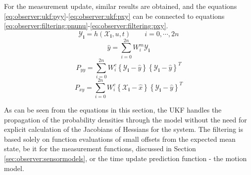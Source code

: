    For the measurement update, similar results are obtained, and the equations
    \eqref{eq:observer:ukf:pyy}-\eqref{eq:observer:ukf:pxy} can be connected to
    equations \eqref{eq:observer:filtering:pnunu}-\eqref{eq:observer:filtering:pxy}.
    \begin{equation}
        \mathbf{\mathcal{Y}_{i}} = h(\mathbf{\mathcal{X}_{i}}, u, t) \qquad i = 0,\cdots,2n
    \end{equation}
    \begin{equation}
        \hat{y} = \sum_{i=0}^{2n}W^{m}_{i}\mathbf{\mathcal{Y}_{i}}
    \end{equation}
    \begin{equation}
        \label{eq:observer:ukf:pyy}
        P_{yy} = \sum_{i=0}^{2n}W^{c}_{i}
            \left\lbrace \mathbf{\mathcal{Y}_{i}} - \hat{y} \right\rbrace
            \left\lbrace \mathbf{\mathcal{Y}_{i}} - \hat{y} \right\rbrace^{T}
    \end{equation}
    \begin{equation}
        \label{eq:observer:ukf:pxy}
        P_{xy} = \sum_{i=0}^{2n}W^{c}_{i}
            \left\lbrace \mathbf{\mathcal{X}_{i}} - \hat{x} \right\rbrace
            \left\lbrace \mathbf{\mathcal{Y}_{i}} - \hat{y} \right\rbrace^{T}
    \end{equation}

    As can be seen from the equations in this section, the UKF handles the
    propagation of the probability densities through the model without
    the need for explicit calculation of the Jacobians of Hessians for the system.
    The filtering is based solely on function evaluations of small offsets from the
    expected mean state, be it for the measurement functions, discussed in
    Section \ref{sec:observer:sensormodels}, or the time update
    prediction function - the motion model.
